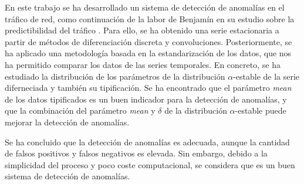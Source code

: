 En este trabajo se ha desarrollado un sistema de detección de anomalías en el tráfico de red, como continuación de la labor de Benjamín en su estudio sobre la predictibilidad del tráfico \cite{benjamin2023}. Para ello, se ha obtenido una serie estacionaria a partir de métodos de diferenciación discreta y convoluciones.
Posteriormente, se ha aplicado una metodología basada en la estandarización de los datos, que nos ha permitido comparar los datos de las series temporales. En concreto, se ha estudiado la distribución de los parámetros de la distribución $\alpha$-estable de la serie diferneciada y también su tipificación. Se ha encontrado que el parámetro \textit{mean} de los datos tipificados es un buen indicador para la detección de anomalías, y que la combinación del parámetro \textit{mean} y $\delta$ de la distribución $\alpha$-estable puede mejorar la detección de anomalías.

Se ha concluido que la detección de anomalías es adecuada, aunque la cantidad de falsos positivos y falsos negativos es elevada. Sin embargo, debido a la simplicidad del proceso y poco coste computacional, se considera que es un buen sistema de detección de anomalías.